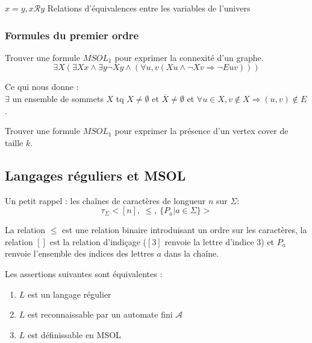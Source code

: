 \documentclass[a4paper, 11pt]{thesis}
\begin{document}
$x=y, x\mathcal{R}y$ Relations d'équivalences entre les variables de l'univers

\subsubsection{Formules du premier ordre}


\begin{exo}
    Trouver une formule $MSOL_1$ pour exprimer la connexité d'un graphe.\\

    \begin{displaymath}
        \exists X (\exists Xx \wedge \exists y \neg Xy \wedge (\forall u,v (Xu \wedge \neg Xv \Rightarrow
        \neg E uv ))) 
    \end{displaymath}

    Ce qui nous donne : \\
    $\exists$ un ensemble de sommets $X$ tq $X \neq \emptyset$ et $\overline{X} \neq \emptyset$ et
    $\forall u \in X, v \not \in X \Rightarrow (u,v) \not \in E$.
\end{exo}

\begin{exo}
    Trouver une formule $MSOL_1$ pour exprimer la présence d'un vertex cover de taille $k$.
\end{exo}


\subsection{Langages réguliers et MSOL}

Un petit rappel : les chaînes de caractères de longueur $n$ sur $\Sigma$: \[
    \tau_\Sigma < [n],\ \leq,\ \{P_a | a \in \Sigma \} >
\]

La relation $\leq$ est une relation binaire introduisant un ordre sur les caractères, la relation
$[]$ est la relation d'indiçage ($[3]$ renvoie la lettre d'indice 3) et $P_a$ renvoie l'ensemble des
indices des lettres $a$ dans la chaîne.

\begin{thrm}[Buchi]
    Les assertions suivantes sont équivalentes : \begin{enumerate}
        \item $L$ est un langage régulier
        \item $L$ est reconnaissable par un automate fini $\mathcal{A}$
        \item $L$ est définissable en MSOL
    \end{enumerate}
\end{thrm}
\end{document}
